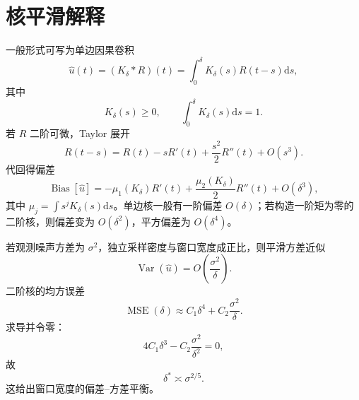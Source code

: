 \documentclass[UTF8,12pt,a4paper,fontset=none]{ctexart}
\numberwithin{equation}{section}
\newcommand{\dd}{\mathrm{d}}
\begin{document}
\section{核平滑解释}
一般形式可写为单边因果卷积
\begin{equation}
 \widehat u(t)=(K_\delta*R)(t)
 =\int_0^\delta K_\delta(s)R(t-s)\dd s,
\end{equation}
其中
\begin{equation}
 K_\delta(s)\ge0,
 \qquad \int_0^\delta K_\delta(s)\dd s=1.
\end{equation}
若 $R$ 二阶可微，Taylor 展开
\begin{equation}
 R(t-s)=R(t)-sR'(t)+\frac{s^2}{2}R''(t)+O(s^3).
\end{equation}
代回得偏差
\begin{equation}
 \operatorname{Bias}[\widehat u]
 =-\mu_1(K_\delta)R'(t)
 +\frac{\mu_2(K_\delta)}2R''(t)+O(\delta^3),
\end{equation}
其中 $\mu_j=\int s^jK_\delta(s)\dd s$。单边核一般有一阶偏差 $O(\delta)$；若构造一阶矩为零的二阶核，则偏差变为 $O(\delta^2)$，平方偏差为 $O(\delta^4)$。

若观测噪声方差为 $\sigma^2$，独立采样密度与窗口宽度成正比，则平滑方差近似
\begin{equation}
 \operatorname{Var}(\widehat u)=O\!\left(\frac{\sigma^2}{\delta}\right).
\end{equation}
二阶核的均方误差
\begin{equation}
 \operatorname{MSE}(\delta)
 \approx C_1\delta^4+C_2\frac{\sigma^2}{\delta}.
\end{equation}
求导并令零：
\begin{equation}
 4C_1\delta^3-C_2\frac{\sigma^2}{\delta^2}=0,
\end{equation}
故
\begin{equation}
 \boxed{\delta^*\asymp\sigma^{2/5}.}
\end{equation}
这给出窗口宽度的偏差--方差平衡。
\end{document}
